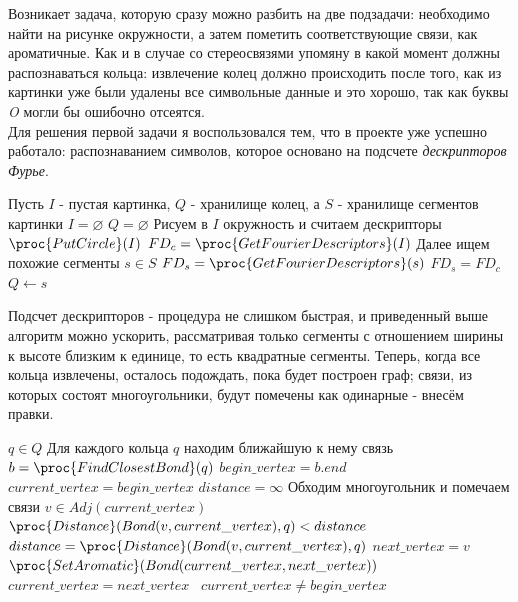 \noindent
Возникает задача, которую сразу можно разбить на две подзадачи: необходимо найти на рисунке окружности, а затем пометить соответствующие связи, 
как ароматичные. Как и в случае со стереосвязями упомяну в какой момент должны распознаваться кольца: извлечение колец должно происходить после того, 
как из картинки уже были удалены все символьные данные и это хорошо, так как буквы \emph{O} могли бы ошибочно отсеятся. \\

\noindent
Для решения первой задачи я воспользовался тем, что в проекте уже успешно работало: распознаванием символов, которое основано на подсчете 
\emph{дескрипторов Фурье}.

\begin{codebox}
  \li \Comment Пусть $I$ - пустая картинка, $Q$ - хранилище колец, а $S$ - хранилище сегментов картинки
  \li $I = \varnothing$
  \li $Q = \varnothing$
  \li \Comment Рисуем в $I$ окружность и считаем дескрипторы
  \li $\proc{PutCircle}(I)$
  \li $ FD_{c} = \proc{GetFourierDescriptors}(I)$
  \li \Comment Далее ищем похожие сегменты
  \li \For $s \in S$
  \li \Do $FD_{s} = \proc{GetFourierDescriptors}(s)$
  \li \If $FD_{s} = FD_{c}$
  \li \Then $Q \gets s$  
\end{codebox}

\noindent
Подсчет дескрипторов - процедура не слишком быстрая, и приведенный выше алгоритм можно ускорить, рассматривая только сегменты
с отношением ширины к высоте близким к единице, то есть квадратные сегменты. Теперь, когда все кольца извлечены, осталось подождать, пока
будет построен граф; связи, из которых состоят многоугольники, будут помечены как одинарные - внесём правки.

\begin{codebox}
  \li \For $q \in Q$
  \li \Comment Для каждого кольца $q$ находим ближайшую к нему связь
  \li \Do $b = \proc{FindClosestBond}(q)$
  \li $begin\_vertex = b.end$
  \li $current\_vertex = begin\_vertex$
  \li $distance = \infty$
  \li \Comment Обходим многоугольник и помечаем связи 
  \li \Repeat 
  \li \For $v \in Adj(current\_vertex)$
  \li \Do \If $\proc{Distance}(Bond(v,current\_vertex), q) < distance $
  \li \Then $distance = \proc{Distance}(Bond(v,current\_vertex), q)$ 
  \li $next\_vertex = v $ \End \End
  \li $\proc{SetAromatic}(Bond(current\_vertex, next\_vertex))$
  \li $current\_vertex = next\_vertex$ \
  \li \Until $current\_vertex \ne begin\_vertex$
\end{codebox}

